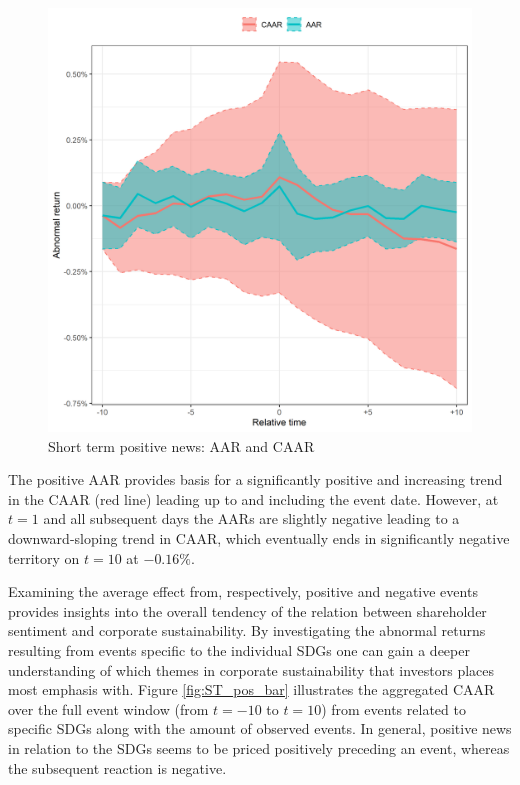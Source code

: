 \begin{figure} [H] 
    \centering
    \includegraphics[scale=0.6]{Projekt/1.Figures analysis/ST_positive_all_CI.png}
    \caption{Short term positive news: AAR and CAAR}
    \label{fig:ST_pos_news}
\end{figure}

The positive AAR provides basis for a significantly positive and increasing trend in the CAAR (red line) leading up to and including the event date. However, at $t = 1$ and all subsequent days the AARs are slightly negative leading to a downward-sloping trend in CAAR, which eventually ends in significantly negative territory on $t = 10$ at $-0.16\%$.

Examining the average effect from, respectively, positive and negative events provides insights into the overall tendency of the relation between shareholder sentiment and corporate sustainability. By investigating the abnormal returns resulting from events specific to the individual SDGs one can gain a deeper understanding of which themes in corporate sustainability that investors places most emphasis with. Figure \ref{fig:ST_pos_bar} illustrates the aggregated CAAR over the full event window (from $t=-10$ to $t=10$) from events related to specific SDGs along with the amount of observed events. In general, positive news in relation to the SDGs seems to be priced positively preceding an event, whereas the subsequent reaction is negative. 

